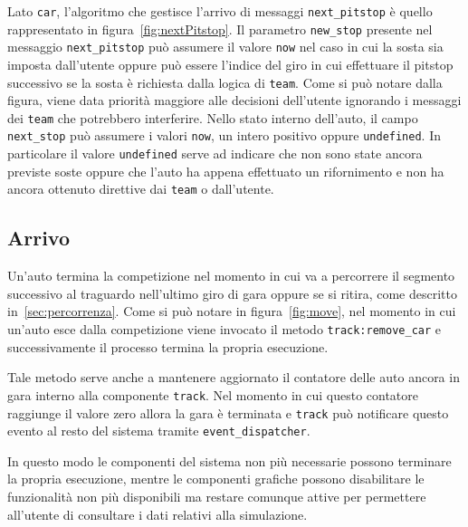 \documentclass[11pt,a4paper]{report}
\newcommand{\fun}[1]{\texttt{#1}}
\begin{document}
Lato \texttt{car}, l'algoritmo che gestisce l'arrivo di messaggi \fun{next\_pitstop} è quello rappresentato in figura~\ref{fig:nextPitstop}. Il parametro \fun{new\_stop} presente nel messaggio \fun{next\_pitstop} può assumere il valore \fun{now} nel caso in cui la sosta sia imposta dall'utente oppure può essere l'indice del giro in cui effettuare il pitstop successivo se la sosta è richiesta dalla logica di \texttt{team}. Come si può notare dalla figura, viene data priorità maggiore alle decisioni dell'utente ignorando i messaggi dei \texttt{team} che potrebbero interferire. Nello stato interno dell'auto, il campo \fun{next\_stop} può assumere i valori \fun{now}, un intero positivo oppure \fun{undefined}. In particolare il valore \fun{undefined} serve ad indicare che non sono state ancora previste soste oppure che l'auto ha appena effettuato un rifornimento e non ha ancora ottenuto direttive dai \texttt{team} o dall'utente.

\subsection{Arrivo}
Un'auto termina la competizione nel momento in cui va a percorrere il segmento successivo al traguardo nell'ultimo giro di gara oppure se si ritira, come descritto in~\ref{sec:percorrenza}. Come si può notare in figura~\ref{fig:move}, nel momento in cui un'auto esce dalla competizione viene invocato il metodo \fun{track:remove\_car} e successivamente il processo termina la propria esecuzione.

Tale metodo serve anche a mantenere aggiornato il contatore delle auto ancora in gara interno alla componente \texttt{track}. Nel momento in cui questo contatore raggiunge il valore zero allora la gara è terminata e \texttt{track} può notificare questo evento al resto del sistema tramite \texttt{event\_dispatcher}.

In questo modo le componenti del sistema non più necessarie possono terminare la propria esecuzione, mentre le componenti grafiche possono disabilitare le funzionalità non più disponibili ma restare comunque attive per permettere all'utente di consultare i dati relativi alla simulazione.
\end{document}
